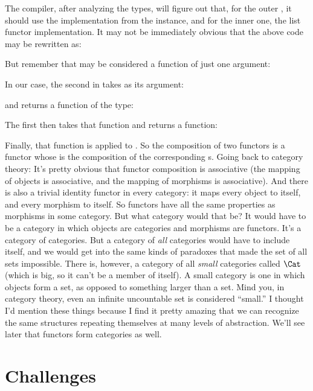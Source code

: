 The compiler, after analyzing the types, will figure out that, for the
outer , it should use the implementation from the
 instance, and for the inner one, the list functor
implementation. It may not be immediately obvious that the above code
may be rewritten as:

But remember that  may be considered a function of just one
argument:

In our case, the second  in  takes
as its argument:

and returns a function of the type:

The first  then takes that function and returns a function:

Finally, that function is applied to . So the composition of
two functors is a functor whose  is the composition of the
corresponding s. Going back to category theory: It's pretty
obvious that functor composition is associative (the mapping of objects
is associative, and the mapping of morphisms is associative). And there
is also a trivial identity functor in every category: it maps every
object to itself, and every morphism to itself. So functors have all the
same properties as morphisms in some category. But what category would
that be? It would have to be a category in which objects are categories
and morphisms are functors. It's a category of categories. But a
category of \emph{all} categories would have to include itself, and we
would get into the same kinds of paradoxes that made the set of all sets
impossible. There is, however, a category of all \emph{small} categories
called $\Cat$ (which is big, so it can't be a member of itself). A
small category is one in which objects form a set, as opposed to
something larger than a set. Mind you, in category theory, even an
infinite uncountable set is considered ``small.'' I thought I'd mention
these things because I find it pretty amazing that we can recognize the
same structures repeating themselves at many levels of abstraction.
We'll see later that functors form categories as well.

\section{Challenges}

